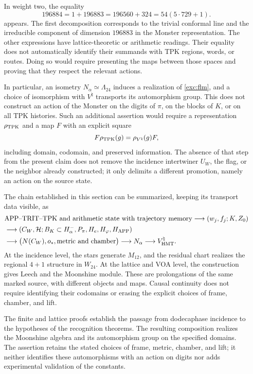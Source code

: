 In weight two, the equality
\[
 196884=1+196883=196560+324=54(5\cdot729+1).
\]
appears. The first decomposition corresponds to the trivial conformal line and the
irreducible component of dimension $196883$ in the Monster
representation. The other expressions have lattice-theoretic or
arithmetic readings. Their equality does not automatically identify their summands
with TPK regions, words, or routes. Doing so would require
presenting the maps between those spaces and proving that they respect the
relevant actions.

\par
In particular, an isometry $N_\alpha\simeq\Lambda_{24}$ induces
a realization of \eqref{exc:flm}, and a choice of isomorphism
with $V^\natural$ transports its automorphism group. This does not
construct an action of the Monster on the digits of
$\pi$, on the blocks of $K$, or on all TPK histories.
Such an additional assertion would require a representation
$\rho_{\rm TPK}$ and a map $F$ with an explicit square
\[
 F\rho_{\rm TPK}(g)=\rho_{V^\natural}(g)F,
\]
including domain, codomain, and preserved information. The absence
of that step from the present claim does not remove the incidence
intertwiner $U_W$, the flag, or the neighbor already constructed; it only
delimits a different promotion, namely an action on the source state.

The chain established in this section can be summarized, keeping
its transport data visible, as
\begin{align*}
 &\text{APP--TRIT--TPK and arithmetic state with trajectory memory}
   \longrightarrow (w_j,f_j;K,Z_0)\\
 &\longrightarrow (C_W,\mathcal H;B_K\subset H^-_\alpha,
                   P_\pi,H_e,H_\varphi,H_{\rm APP})\\
 &\longrightarrow \bigl(N(C_W),o_*,\text{metric and chamber}\bigr)
   \longrightarrow N_\alpha
   \longrightarrow V^\natural_{\rm HMT}.
\end{align*}
At the incidence level, the stars generate $M_{12}$, and the
residual chart realizes the regional $4+1$ structure in $W_{24}$.
At the lattice and VOA level, the construction gives Leech and the
Moonshine module. These are prolongations of the same marked source, with
different objects and maps. Causal continuity does not require
identifying their codomains or erasing the explicit choices
of frame, chamber, and lift.

The finite and lattice proofs establish the passage from dodecaphase
incidence to the hypotheses of the recognition theorems. The resulting
composition realizes the Moonshine algebra and its automorphism group
on the specified domains. The assertion retains the stated choices
of frame, metric, chamber, and lift; it neither identifies these
automorphisms with an action on digits nor adds experimental
validation of the constants.
